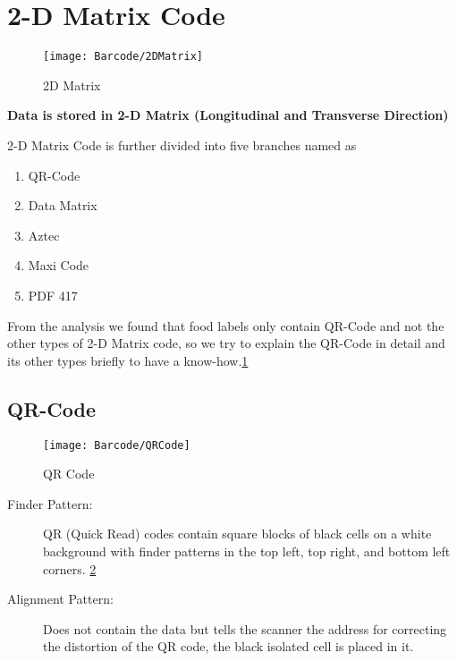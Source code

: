 \section{2-D Matrix Code}

\begin{figure}
	\begin{center}
		\texttt{[image: Barcode/2DMatrix]}
		\caption{2D Matrix}\label{2D Matrix}
	\end{center}
\end{figure}

\textbf{Data is stored in 2-D Matrix (Longitudinal and Transverse Direction)}

2-D Matrix Code is further divided into five branches named as

\begin{enumerate}
	\item QR-Code
	\item Data Matrix 
	\item Aztec 
	\item Maxi Code
	\item PDF 417	
\end{enumerate}

From the analysis we found that food labels only contain QR-Code and not the other types of 2-D Matrix code, so we try to explain the QR-Code in detail and its other types briefly to have a know-how.\ref{2D Matrix}

\subsection{QR-Code}
\begin{figure}
	\begin{center}
		\texttt{[image: Barcode/QRCode]}
		\caption{QR Code}\label{QR Code}
	\end{center}
\end{figure}

\begin{description}
	\item [Finder Pattern:] 
	QR (Quick Read) codes contain square blocks of black cells on a white background with finder patterns in the top left, top right, and bottom left corners. \ref{QR Code}
\end{description}

\begin{description}
	\item [Alignment Pattern:]
	Does not contain the data but tells the scanner the address for correcting the distortion of the QR code, the black isolated cell is placed in it.
\end{description}

